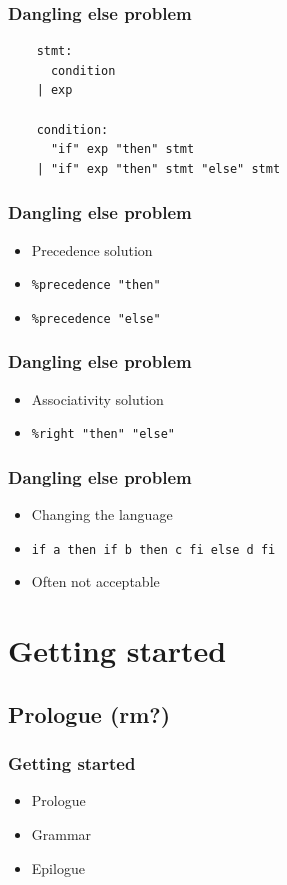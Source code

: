 \documentclass{beamer}
\begin{document}
\begin{frame}[fragile]
  \frametitle{Dangling else problem}
\begin{verbatim}
    stmt:
      condition
    | exp

    condition:
      "if" exp "then" stmt
    | "if" exp "then" stmt "else" stmt
\end{verbatim}
\end{frame}

\begin{frame}
  \frametitle{Dangling else problem}
    \begin{itemize}
      \item Precedence solution
      \item \texttt{\%precedence "then"}
      \item \texttt{\%precedence "else"}
    \end{itemize}
\end{frame}

\begin{frame}
  \frametitle{Dangling else problem}
    \begin{itemize}
      \item Associativity solution
      \item \texttt{\%right "then" "else"}
    \end{itemize}
\end{frame}

\begin{frame}
  \frametitle{Dangling else problem}
    \begin{itemize}
      \item Changing the language
      \item \texttt{if a then if b then c fi else d fi}
      \item Often not acceptable
    \end{itemize}
\end{frame}

\section{Getting started}

\subsection{Prologue (rm?)}

\begin{frame}
  \frametitle{Getting started}
    \begin{itemize}
      \item Prologue
      \item Grammar
      \item Epilogue
    \end{itemize}
\end{frame}
\end{document}
